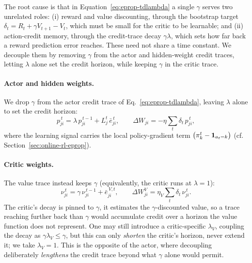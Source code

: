 The root cause is that in Equation~\eqref{eq:eprop-tdlambda} a single $\gamma$
serves two unrelated roles: (i) reward and value discounting, through
the bootstrap target $\delta_t = R_t + \gamma V_{t+1} - V_t$, which must be
small for the critic to be learnable; and (ii) action-credit memory,
through the credit-trace decay $\gamma\lambda$, which sets how far back a
reward prediction error reaches. These need not share a time constant. We
decouple them by removing $\gamma$ from the actor and hidden-weight credit
traces, letting $\lambda$ alone set the credit horizon, while keeping $\gamma$
in the critic trace.

\paragraph{Actor and hidden weights.}
We drop $\gamma$ from the actor credit trace of Eq.~\eqref{eq:eprop-tdlambda},
leaving $\lambda$ alone to set the credit horizon:
\begin{equation}
p^{\,t}_{ji} = \lambda\, p^{\,t-1}_{ji} + L^t_j\, \bar{e}^{\,t}_{ji},
\qquad
\Delta W_{ji} = -\eta \sum_t \delta_t\, p^{\,t}_{ji},
\label{eq:actor-modified}
\end{equation}
where the learning signal carries the local policy-gradient term
$\big(\pi^t_k - \mathbbm{1}_{a_t = k}\big)$ (cf. Section~\ref{sec:online-rl-eprop}).

\paragraph{Critic weights.}
The value trace instead keeps $\gamma$ (equivalently, the critic runs at $\lambda=1$):
\begin{equation}
\nu^{\,t}_{ji} = \gamma\, \nu^{\,t-1}_{ji} + \bar{e}^{\,V,t}_{ji},
\qquad
\Delta W^{V}_{ji} = \eta_V \sum_t \delta_t\, \nu^{\,t}_{ji}.
\label{eq:critic-modified}
\end{equation}
%
The critic's decay is pinned to $\gamma$, it estimates the $\gamma$-discounted
value, so a trace reaching further back than $\gamma$ would accumulate credit
over a horizon the value function does not represent. One may still introduce a
critic-specific $\lambda_V$, coupling the decay as $\gamma\lambda_V \le \gamma$,
but this can only \emph{shorten} the critic's horizon, never extend it; we take
$\lambda_V = 1$. This is the opposite of the actor, where decoupling deliberately
\emph{lengthens} the credit trace beyond what $\gamma$ alone would permit.


